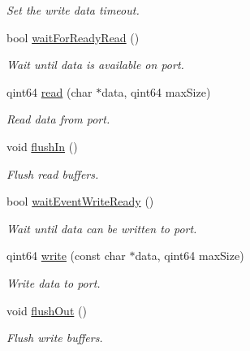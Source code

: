 \begin{DoxyCompactItemize}
\begin{DoxyCompactList}\small\item\em Set the write data timeout. \end{DoxyCompactList}\item 
bool \hyperlink{classmdt_port_af8737cc14667f6770af7be01759253e2}{waitForReadyRead} ()
\begin{DoxyCompactList}\small\item\em Wait until data is available on port. \end{DoxyCompactList}\item 
qint64 \hyperlink{classmdt_port_ad8a196bb21b6ca76dffb068a1692904a}{read} (char $\ast$data, qint64 maxSize)
\begin{DoxyCompactList}\small\item\em Read data from port. \end{DoxyCompactList}\item 
\hypertarget{classmdt_port_a2fea088c8e5ad4578f521a39c353f7c3}{
void \hyperlink{classmdt_port_a2fea088c8e5ad4578f521a39c353f7c3}{flushIn} ()}
\label{classmdt_port_a2fea088c8e5ad4578f521a39c353f7c3}

\begin{DoxyCompactList}\small\item\em Flush read buffers. \end{DoxyCompactList}\item 
bool \hyperlink{classmdt_port_a2307bdc3b7d89f27e65b96b8a359b70a}{waitEventWriteReady} ()
\begin{DoxyCompactList}\small\item\em Wait until data can be written to port. \end{DoxyCompactList}\item 
qint64 \hyperlink{classmdt_port_a62f4a6f2c547d40d3743ce893e0f64d6}{write} (const char $\ast$data, qint64 maxSize)
\begin{DoxyCompactList}\small\item\em Write data to port. \end{DoxyCompactList}\item 
\hypertarget{classmdt_port_a42022f9fe08166418711b956c6aabb49}{
void \hyperlink{classmdt_port_a42022f9fe08166418711b956c6aabb49}{flushOut} ()}
\label{classmdt_port_a42022f9fe08166418711b956c6aabb49}

\begin{DoxyCompactList}\small\item\em Flush write buffers. \end{DoxyCompactList}\end{DoxyCompactItemize}


